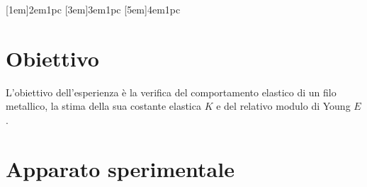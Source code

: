 \documentclass[a4paper,11pt,oneside]{article}
\begin{document}


\tableofcontents
{}
\contentsmargin{6em}
[1em]{\bigskip}{2em}{1pc}
[3em]{\smallskip}{3em}{1pc}
[5em]{\smallskip}{4em}{1pc}


\newpage

\section{Obiettivo}
L'obiettivo dell'esperienza è la verifica del comportamento elastico di un filo metallico, la stima della sua costante elastica $K$ e del relativo modulo di Young $E$.

\section{Apparato sperimentale}\label{section:apparato}
\end{document}
